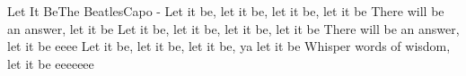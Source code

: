 \begin{song}{Let It Be}{The Beatles}{Capo -}
Let it be, let it be, let it be, let it be
There will be an answer, let it be
Let it be, let it be, let it be, let it be
There will be an answer, let it be eeee
Let it be, let it be, let it be, ya let it be
Whisper words of wisdom, let it be eeeeeee

\end{song}
